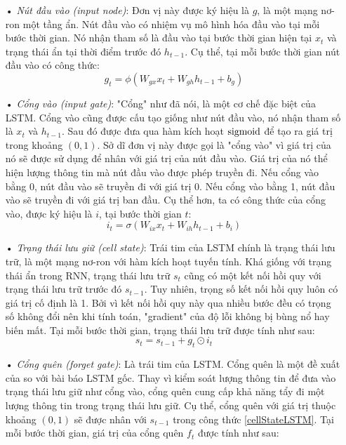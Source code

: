\begin{itemize}
	\item[•] \textit{Nút đầu vào (input node)}: Đơn vị này được ký hiệu là $g$, là một mạng nơ-ron một tầng ẩn. Nút đầu vào có nhiệm vụ mô hình hóa đầu vào tại mỗi bước thời gian. Nó nhận tham số là đầu vào tại bước thời gian hiện tại $x_t$ và trạng thái ẩn tại thời điểm trước đó $h_{t-1}$. Cụ thể, tại mỗi bước thời gian nút đầu vào có công thức:
	\begin{equation} \label{inputNodeLSTM}
		g_t = \phi \left(W_{gx}x_t + W_{gh}h_{t-1} + b_g \right)
	\end{equation}
	\item[•] \textit{Cổng vào (input gate)}: "Cổng" như đã nói, là một cơ chế đặc biệt của LSTM. Cổng vào cũng được cấu tạo giống như nút đầu vào, nó nhận tham số là $x_t$ và $h_{t-1}$. Sau đó được đưa qua hàm kích hoạt $\mathrm{sigmoid}$ để tạo ra giá trị trong khoảng $(0,1)$. Sở dĩ đơn vị này được gọi là "cổng vào" vì giá trị của nó sẽ được sử dụng để nhân với giá trị của nút đầu vào. Giá trị của nó thể hiện lượng thông tin mà nút đầu vào được phép truyền đi. Nếu cổng vào bằng 0, nút đầu vào sẽ truyền đi với giá trị 0. Nếu cổng vào bằng 1, nút đầu vào sẽ truyền đi với giá trị ban đầu. Cụ thể hơn, ta có công thức của cổng vào, được ký hiệu là $i$, tại bước thời gian $t$:
	\begin{equation} \label{inputGateLSTM}
		i_t = \sigma \left(W_{ix}x_t + W_{ih}h_{t-1} + b_i \right)
	\end{equation}
	\item[•] \textit{Trạng thái lưu giữ (cell state)}: Trái tim của LSTM chính là trạng thái lưu trữ, là một mạng nơ-ron với hàm kích hoạt tuyến tính. Khá giống với trạng thái ẩn trong RNN, trạng thái lưu trữ $s_t$ cũng có một kết nối hồi quy với trạng thái lưu trữ trước đó $s_{t-1}$. Tuy nhiên, trọng số kết nối hồi quy luôn có giá trị cố định là 1. Bởi vì kết nối hồi quy này qua nhiều bước đều có trọng số không đổi nên khi tính toán, "gradient" của độ lỗi không bị bùng nổ hay biến mất. Tại mỗi bước thời gian, trạng thái lưu trữ được tính như sau:
	\begin{equation} \label{cellStateLSTM}
		s_t = s_{t-1} + g_t \odot i_t
	\end{equation}
	\item[•] \textit{Cổng quên (forget gate)}: Là trái tim của LSTM. Cổng quên là một đề xuất của \cite{gers2000} so với bài báo LSTM gốc. Thay vì kiểm soát lượng thông tin để đưa vào trạng thái lưu giữ như cổng vào, cổng quên cung cấp khả năng tẩy đi một lượng thông tin trong trạng thái lưu giữ. Cụ thể, cổng quên với giá trị thuộc khoảng $(0,1)$ sẽ được nhân với $s_{t-1}$ trong công thức \ref{cellStateLSTM}. Tại mỗi bước thời gian, giá trị của cổng quên $f_t$ được tính như sau:

\end{itemize}
